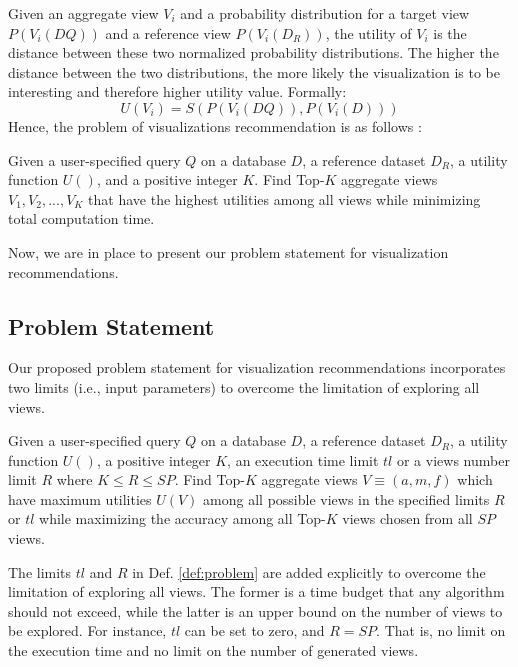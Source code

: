 Given an aggregate view $V_i$ and a probability distribution for a target view $P(V_i(DQ))$ and a reference view $P(V_i(D_R))$, the utility of $V_i$ is the distance between these two normalized probability distributions.
% 
The higher the distance between the two distributions, the more likely the visualization is to be interesting and therefore higher utility value.
%
%
Formally:
%
\begin{equation}
\label{eq:utility}
U(V_i) = S( P(V_i(DQ)), P(V_i(D)) )
\end{equation}
%
%
Hence, the problem of visualizations recommendation is as follows \cite{DBLP:journals/pvldb/VartakMPP14}:
%
\begin{definition}
Given a user-specified query $Q$ on a database $D$, a reference dataset $D_R$, a utility function $U()$, and a positive integer $K$. 
%
Find Top-$K$ aggregate views $V_1, V_2, ..., V_K$ that have the highest utilities among all views while minimizing total computation time.
%
\end{definition}
%

Now, we are in place to present our problem statement for visualization recommendations.
%
\subsection{Problem Statement}
\label{sec:problem_statement}
%
Our proposed problem statement for visualization recommendations incorporates two limits (i.e., input parameters) to overcome the limitation of exploring all views.
%
%
\begin{definition}
\label{def:problem}
%
Given a user-specified query $Q$ on a database $D$, a reference dataset $D_R$,  a utility function $U()$, a positive integer $K$, an execution time limit $tl$ or a views number limit $R$ where $K \leq R \leq SP$.
%
Find Top-$K$ aggregate views $V \equiv (a, m, f )$ which have maximum utilities $U(V)$ among all possible views in the 
specified limits $R$ or $tl$ while maximizing the accuracy among all Top-$K$ views chosen from all $SP$ views.
%
\end{definition}
%
The limits $tl$ and $R$ in Def. \ref{def:problem} are added explicitly to overcome the limitation of exploring all views.
%
The former is a time budget that any algorithm should not exceed, while the latter is an upper bound on the number of views to be explored.
%
For instance, $tl$ can be set to zero, and $R = SP$. That is, no limit on the execution time and no limit on the number of generated views.
%
%

